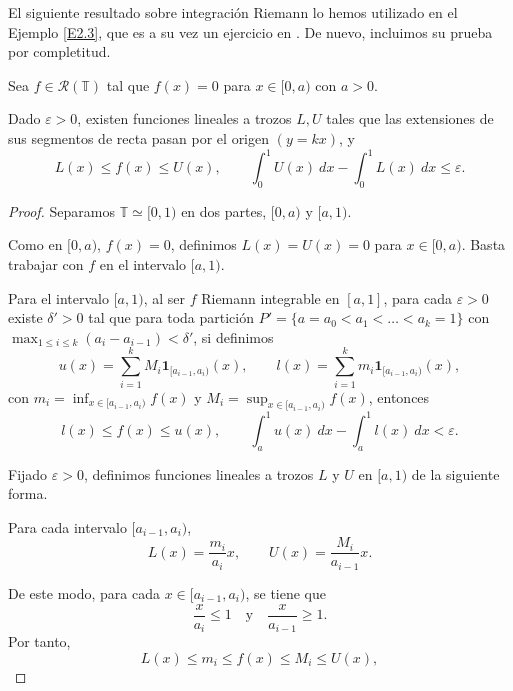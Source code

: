 
El siguiente resultado sobre integración Riemann lo hemos utilizado en el Ejemplo \ref{E2.3}, que es a su vez un ejercicio en \cite[Exer 1.14]{kuipers-1974}. De nuevo, incluimos su prueba por completitud.

\begin{theorem}
    \label{aux:14}
    Sea $f \in \mathcal{R}(\mathbb{T})$ tal que $f(x)=0$ para $x \in [0,a)$ con $a>0$. 
    
    Dado $\varepsilon > 0$, existen funciones lineales a trozos $L,U$ tales que las extensiones
    de sus segmentos de recta pasan por el origen $(y=kx)$, y 
    \[
        L(x) \leq f(x) \leq U(x), \qquad \int_0^1 U(x)\ dx - \int_0^1 L(x)\ dx \leq \varepsilon.
    \]
\end{theorem}

\begin{proof}
    Separamos $\mathbb{T}\simeq[0,1)$ en dos partes, $[0,a)$ y $[a,1)$. 

    Como en $[0,a)$, $f(x)=0$, definimos $L(x) = U(x) = 0$ para $x \in [0,a)$. 
    Basta trabajar con $f$ en el intervalo $[a,1)$.

    Para el intervalo $[a,1)$, al ser $f$ Riemann integrable en $[a,1]$, para cada $\varepsilon > 0$ 
    existe $\delta' > 0$ tal que para toda partición $P'=\{a=a_0 < a_1 < \ldots < a_k=1\}$ con 
    $\max_{1 \leq i \leq k} (a_i - a_{i-1}) < \delta'$, si definimos
    \[
        u(x) = \sum_{i=1}^k M_i \mathbf{1}_{[a_{i-1}, a_i)}(x), \qquad 
        l(x) = \sum_{i=1}^k m_i \mathbf{1}_{[a_{i-1}, a_i)}(x),
    \]
    con $m_i = \inf_{x \in [a_{i-1}, a_i)} f(x)$ y $M_i = \sup_{x \in [a_{i-1}, a_i)} f(x)$, entonces
    \[
        l(x) \leq f(x) \leq u(x), \qquad \int_a^1 u(x)\ dx - \int_a^1 l(x)\ dx < \varepsilon.
    \]

    Fijado $\varepsilon > 0$, definimos funciones lineales a trozos $L$ y $U$ en $[a,1)$ de la siguiente forma. 
    
    Para cada intervalo $[a_{i-1}, a_i)$,  
    \[
        L(x) = \frac{m_i}{a_i} x, \qquad U(x) = \frac{M_i}{a_{i-1}} x.
    \]

    De este modo, para cada $x \in [a_{i-1}, a_i)$, se tiene que
    \[
        \frac{x}{a_i} \leq 1 \quad \text{y} \quad \frac{x}{a_{i-1}} \geq 1.
    \]
    Por tanto,
    \[
        L(x) \leq m_i \leq f(x) \leq M_i \leq U(x),
    \]


\end{proof}
